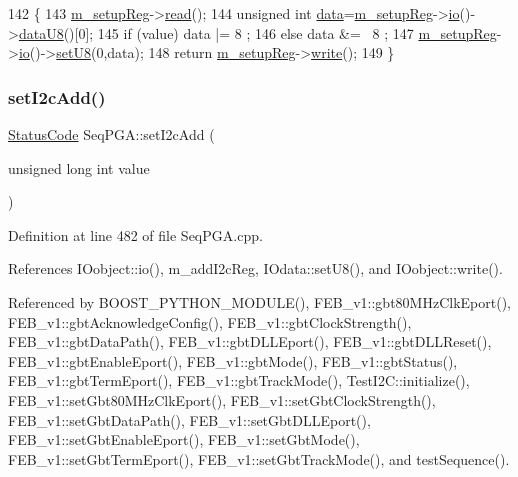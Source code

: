 \begin{DoxyCode}
142                                          \{
143   \hyperlink{classSeqPGA_a03269241e7fc26493cd0595beda334c2}{m\_setupReg}->\hyperlink{classIOobject_aa07610c11963b1db6710e3c76ceea456}{read}();
144   \textcolor{keywordtype}{unsigned} \textcolor{keywordtype}{int} \hyperlink{namespaceshell_a5ea2525995cedc3efd69ea8a7f034d1e}{data}=\hyperlink{classSeqPGA_a03269241e7fc26493cd0595beda334c2}{m\_setupReg}->\hyperlink{classIOobject_af04fb94137c3d86849f478ac5afab5d1}{io}()->\hyperlink{classIOdata_a75e9c318dbac3a39402179070943d4bc}{dataU8}()[0];
145   \textcolor{keywordflow}{if} (value) data |=  8 ;
146   \textcolor{keywordflow}{else}       data &= ~8 ;
147   \hyperlink{classSeqPGA_a03269241e7fc26493cd0595beda334c2}{m\_setupReg}->\hyperlink{classIOobject_af04fb94137c3d86849f478ac5afab5d1}{io}()->\hyperlink{classIOdata_a6c4fb2f2af01889ada889c2b7aceb24d}{setU8}(0,data);
148   \textcolor{keywordflow}{return} \hyperlink{classSeqPGA_a03269241e7fc26493cd0595beda334c2}{m\_setupReg}->\hyperlink{classIOobject_a9f6984bc9f0fadcf800f1be2523ac744}{write}();
149 \}
\end{DoxyCode}
\mbox{\label{classSeqPGA_a4ef334e4d2cb417b49033dce951728cd}} 
\subsubsection{\texorpdfstring{set\+I2c\+Add()}{setI2cAdd()}}
{\footnotesize\ttfamily \hyperlink{classStatusCode}{Status\+Code} Seq\+P\+G\+A\+::set\+I2c\+Add (\begin{DoxyParamCaption}\item[{unsigned long int}]{value }\end{DoxyParamCaption})}



Definition at line 482 of file Seq\+P\+G\+A.\+cpp.



References I\+Oobject\+::io(), m\+\_\+add\+I2c\+Reg, I\+Odata\+::set\+U8(), and I\+Oobject\+::write().



Referenced by B\+O\+O\+S\+T\+\_\+\+P\+Y\+T\+H\+O\+N\+\_\+\+M\+O\+D\+U\+L\+E(), F\+E\+B\+\_\+v1\+::gbt80\+M\+Hz\+Clk\+Eport(), F\+E\+B\+\_\+v1\+::gbt\+Acknowledge\+Config(), F\+E\+B\+\_\+v1\+::gbt\+Clock\+Strength(), F\+E\+B\+\_\+v1\+::gbt\+Data\+Path(), F\+E\+B\+\_\+v1\+::gbt\+D\+L\+L\+Eport(), F\+E\+B\+\_\+v1\+::gbt\+D\+L\+L\+Reset(), F\+E\+B\+\_\+v1\+::gbt\+Enable\+Eport(), F\+E\+B\+\_\+v1\+::gbt\+Mode(), F\+E\+B\+\_\+v1\+::gbt\+Status(), F\+E\+B\+\_\+v1\+::gbt\+Term\+Eport(), F\+E\+B\+\_\+v1\+::gbt\+Track\+Mode(), Test\+I2\+C\+::initialize(), F\+E\+B\+\_\+v1\+::set\+Gbt80\+M\+Hz\+Clk\+Eport(), F\+E\+B\+\_\+v1\+::set\+Gbt\+Clock\+Strength(), F\+E\+B\+\_\+v1\+::set\+Gbt\+Data\+Path(), F\+E\+B\+\_\+v1\+::set\+Gbt\+D\+L\+L\+Eport(), F\+E\+B\+\_\+v1\+::set\+Gbt\+Enable\+Eport(), F\+E\+B\+\_\+v1\+::set\+Gbt\+Mode(), F\+E\+B\+\_\+v1\+::set\+Gbt\+Term\+Eport(), F\+E\+B\+\_\+v1\+::set\+Gbt\+Track\+Mode(), and test\+Sequence().


